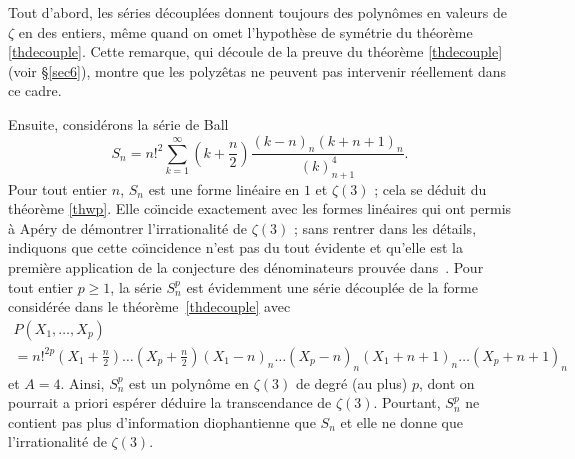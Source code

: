 \documentclass[12pt,francais, reqno]{smfart}
\numberwithin{equation}{section}
\begin{document}
Tout d'abord, les s\'eries d\'ecoupl\'ees donnent toujours des polyn\^omes en valeurs de $\zeta$ en des entiers, m\^eme quand on omet l'hypoth\`ese de sym\'etrie du  th\'eor\`eme \ref{thdecouple}. Cette remarque, qui d\'ecoule de la preuve du  th\'eor\`eme \ref{thdecouple} (voir \S \ref{sec6}), montre que les polyz\^etas ne peuvent pas intervenir r\'eellement dans ce cadre.

\bigskip

Ensuite, consid\'erons  la s\'erie de Ball  
$$
S_n=n!^2 \sum_{k=1}^{\infty} (k + \frac{n}{2}) \frac{(k-n)_{n}(k+n+1)_n}{(k)_{n+1}^4}.
$$
Pour tout entier $n$, $S_n$ est une forme lin\'eaire en $1$ et $\zeta(3)$ ;  
cela se d\'eduit du th\'eor\`eme \ref{thwp}. Elle co{\"\i}ncide 
exactement avec les formes lin\'eaires  qui ont permis 
\`a Ap\'ery de d\'emontrer l'irrationalit\'e de 
$\zeta(3)$ ; sans rentrer dans les d\'etails, indiquons que 
cette co{\"\i}ncidence n'est pas du tout \'evidente et qu'elle 
est la premi\`ere application de la conjecture 
des d\'enominateurs prouv\'ee dans~\cite{KR}. 
Pour tout entier $p\ge 1$, la s\'erie $S_n^p$ est \'evidemment une s\'erie d\'ecoupl\'ee de la forme consid\'er\'ee dans 
le th\'eor\`eme~\ref{thdecouple} avec 
\begin{multline*}
P(X_1, \ldots, X_p)
\\
= n!^{2p}  (X_1  + \frac{n}{2})\ldots  (X_p + \frac{n}{2}) (X_1-n)_{n}\ldots (X_p-n)_{n} (X_1+n+1)_n \ldots (X_p+n+1)_n 
\end{multline*}
et $A = 4$. Ainsi,  $S_n^p$ est un polyn\^ome
 en $\zeta(3)$ de degr\'e (au plus) $p$, dont on pourrait a priori esp\'erer d\'eduire la transcendance de $\zeta(3)$. Pourtant, 
$S_n^p$ ne contient pas plus d'information diophantienne que $S_n$ et elle ne donne que l'irrationalit\'e de $\zeta(3)$. 

\bigskip
\end{document}
